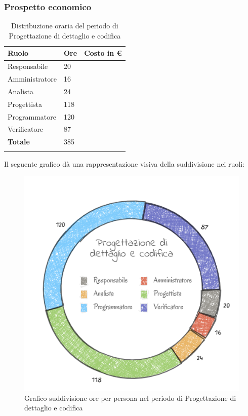 \subsubsection{Prospetto economico}
\begin{longtable}{| C{.30\textwidth}| C{.15\textwidth}| C{.20\textwidth}|}
	\hline
	\textbf{Ruolo} & \textbf{Ore} & \textbf{Costo in \euro} \\
	\hline 
	Responsabile & 20 &  \\
	\hline
	Amministratore & 16 & \\
	\hline
	Analista & 24 &  \\
	\hline
	Progettista & 118 &  \\
	\hline
	Programmatore & 120 &  \\
	\hline
	Verificatore & 87 &  \\
	\hline
	\textbf{Totale} & 385 & \\ 
	\hline
	
	\caption{Distribuzione oraria del periodo di Progettazione di dettaglio e codifica}
	\label{Distribuzione oraria del periodo di Progettazione di dettaglio e codifica}
\end{longtable}

Il seguente grafico dà una rappresentazione visiva della suddivisione nei ruoli:
\begin{figure}[H]
	\centering
	\includegraphics[width=0.8\linewidth]{./images/Torta_progettazione_dettaglioCod.png}
	\caption{Grafico suddivisione ore per persona nel periodo di Progettazione  di dettaglio e codifica}
	\label{fig:grafico suddivione ruoli periodo di Progettazione  di dettaglio e codifica}
\end{figure}


